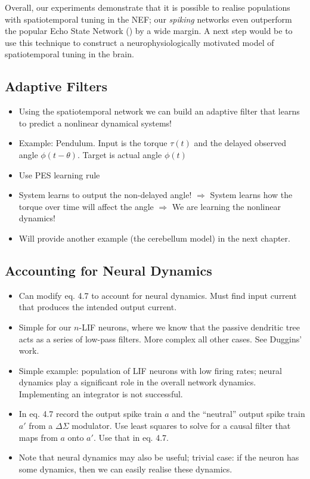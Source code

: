 Overall, our experiments demonstrate that it is possible to realise populations with spatiotemporal tuning in the NEF; our \emph{spiking} networks even outperform the popular Echo State Network (\cite{jaeger2004harnessing}) by a wide margin.
A next step would be to use this technique to construct a neurophysiologically motivated model of spatiotemporal tuning in the brain.

\pagebreak

\subsection{Adaptive Filters}
\label{sec:adaptive_filter}

\begin{itemize}
	\item Using the spatiotemporal network we can build an adaptive filter that learns to predict a nonlinear dynamical systems!
	\item Example: Pendulum. Input is the torque $\tau(t)$ and the delayed observed angle $\phi(t - \theta)$. Target is actual angle $\phi(t)$
	\item Use PES learning rule
	\item System learns to output the non-delayed angle! $\Rightarrow$ System learns how the torque over time will affect the angle $\Rightarrow$ We are learning the nonlinear dynamics!
	\item Will provide another example (the cerebellum model) in the next chapter.
\end{itemize}

\subsection{Accounting for Neural Dynamics}

\begin{itemize}
	\item Can modify eq. 4.7 to account for neural dynamics. Must find input current that produces the intended output current.
	\item Simple for our $n$-LIF neurons, where we know that the passive dendritic tree acts as a series of low-pass filters. More complex all other cases. See Duggins' work.
	\item Simple example: population of LIF neurons with low firing rates; neural dynamics play a significant role in the overall network dynamics. Implementing an integrator is not successful.
	\item In eq. 4.7 record the output spike train $a$ and the \enquote{neutral} output spike train $a'$ from a $\Delta\Sigma$ modulator. Use least squares to solve for a causal filter that maps from $a$ onto $a'$. Use that in eq. 4.7.
	\item Note that neural dynamics may also be useful; trivial case: if the neuron has some dynamics, then we can easily realise these dynamics.
\end{itemize}